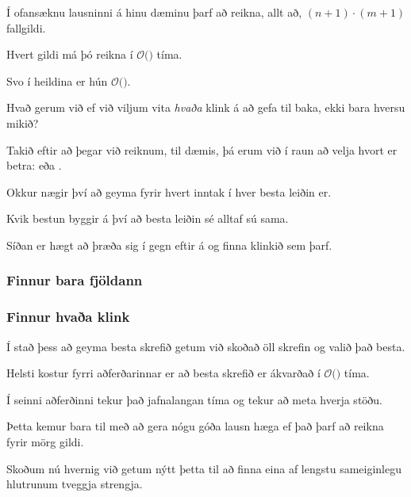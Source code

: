 {
    {
        \item<1-> Í ofansæknu lausninni á hinu dæminu þarf að reikna, allt að, $(n + 1) \cdot (m + 1)$ fallgildi.
            \item<2-> Hvert gildi má þó reikna í $\mathcal{O}($$)$ tíma.
            \item<4-> Svo í heildina er hún $\mathcal{O}($$)$.
            \item<1->[] 
    }
}

{
    {
        \item<1-> Hvað gerum við ef við viljum vita \emph{hvaða} klink á að gefa til baka, ekki bara hversu mikið?
            \item<2-> Takið eftir að þegar við reiknum, til dæmis, 
        þá erum við í raun að velja hvort er betra:  eða .
            \item<3-> Okkur nægir því að geyma fyrir hvert inntak í  hver besta leiðin er.
            \item<4-> Kvik bestun byggir á því að besta leiðin sé alltaf sú sama.
            \item<5-> Síðan er hægt að þræða sig í gegn eftir á og finna klinkið sem þarf.
    }
}

{
    \frametitle{Finnur bara fjöldann}
}

{
    \frametitle{Finnur hvaða klink}
}

{
    {
        \item<1-> Í stað þess að geyma besta skrefið getum við skoðað öll skrefin og valið það besta.
    }
}

{
}

{
    {
        \item<1-> Helsti kostur fyrri aðferðarinnar er að besta skrefið er ákvarðað í $\mathcal{O}($$)$ tíma.
            \item<3-> Í seinni aðferðinni tekur það jafnalangan tíma og  tekur að meta hverja stöðu.
            \item<4-> Þetta kemur bara til með að gera nógu góða lausn hæga ef það þarf að reikna fyrir mörg gildi.
            \item<5-> Skoðum nú hvernig við getum nýtt þetta til að finna eina af lengstu sameiginlegu hlutrunum tveggja strengja.
    }
}

